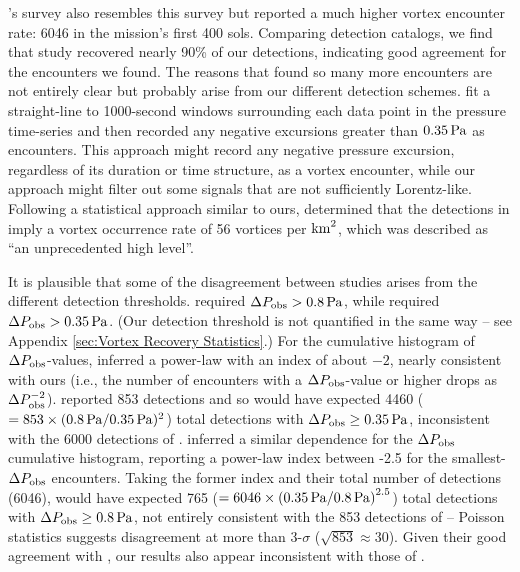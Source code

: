 \documentclass{aastex63}
\begin{document}
\citet{Spiga2021}'s survey also resembles this survey but reported a much higher vortex encounter rate: 6046 in the mission's first 400 sols. Comparing detection catalogs, we find that study recovered nearly 90\% of our detections, indicating good agreement for the encounters we found. The reasons that \citet{Spiga2021} found so many more encounters are not entirely clear but probably arise from our different detection schemes. \citet{Spiga2021} fit a straight-line to 1000-second windows surrounding each data point in the pressure time-series and then recorded any negative excursions greater than $0.35\,{\rm Pa}$ as encounters. This approach might record any negative pressure excursion, regardless of its duration or time structure, as a vortex encounter, while our approach might filter out some signals that are not sufficiently Lorentz-like. Following a statistical approach similar to ours, \citet{2021Icar..35814200K} determined that the detections in \citet{Spiga2021} imply a vortex occurrence rate of 56 vortices per ${\rm km}^2$, which was described as ``an unprecedented high level''.

It is plausible that some of the disagreement between studies arises from the different detection thresholds. \citet{2021Icar..35514119L} required $\Delta P_{\rm obs} > 0.8\,{\rm Pa}$, while \citet{Spiga2021} required $\Delta P_{\rm obs} > 0.35\,{\rm Pa}$. (Our detection threshold is not quantified in the same way -- see Appendix \ref{sec:Vortex Recovery Statistics}.) For the cumulative histogram of $\Delta P_{\rm obs}$-values, \citet{2021Icar..35514119L} inferred a power-law with an index of about $-2$, nearly consistent with ours (i.e., the number of encounters with a $\Delta P_{\rm obs}$-value or higher drops as $\Delta P_{\rm obs}^{-2}$). \citet{2021Icar..35514119L} reported 853 detections and so would have expected 4460 ($= 853 \times (0.8\,{\rm Pa}/0.35\,{\rm Pa})^2$) total detections with $\Delta P_{\rm obs} \geq 0.35\,{\rm Pa}$, inconsistent with the 6000 detections of \citet{Spiga2021}. \citet{Spiga2021} inferred a similar dependence for the $\Delta P_{\rm obs}$ cumulative histogram, reporting a power-law index between -2.5 for the smallest-$\Delta P_{\rm obs}$ encounters. Taking the former index and their total number of detections (6046), \citet{Spiga2021} would have expected 765 ($= 6046 \times \left(0.35\,{\rm Pa}/0.8\,{\rm Pa} \right)^{2.5}$) total detections with $\Delta P_{\rm obs} \geq 0.8\,{\rm Pa}$, not entirely consistent with the 853 detections of \citet{2021Icar..35514119L} -- Poisson statistics suggests disagreement at more than 3-$\sigma$ ($\sqrt{853} \approx 30$). Given their good agreement with \citet{2021Icar..35514119L}, our results also appear inconsistent with those of \citet{Spiga2021}.
\end{document}
